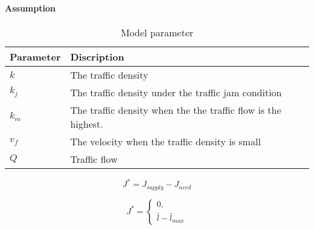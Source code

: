 \paragraph{Assumption}


\begin{table}
\centering
\begin{tabular}{ll}
\hline
Parameter & Discription\\
\hline
$k$ & The traffic density\\
$k_j$ & The traffic density under the traffic jam condition\\
$k_m$ & The traffic density when the the traffic flow is the highest.\\
$v_f$ & The velocity when the traffic density is small \\
$Q$ & Traffic flow \\
\hline
\end{tabular}
\caption{Model parameter}
\end{table}


\begin{equation}
J^* = J_{supply} - J_{need}
\end{equation}

\[ J^* = \begin{cases}
0,\\
\bar{l} - \bar{l}_{max}
\end{cases}\]



